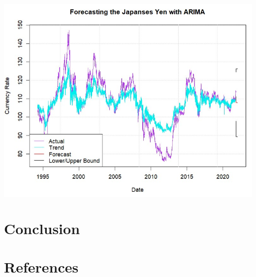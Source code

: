 \documentclass[11pt,preprint, authoryear]{elsarticle}
\let\origfigure\figure
\let\endorigfigure\endfigure
\renewenvironment{figure}[1][2] {
    \expandafter\origfigure\expandafter[H]
} {
    \endorigfigure
}
\numberwithin{equation}{section}
\numberwithin{figure}{section}
\numberwithin{table}{section}
\begin{document}
\begin{figure}
\centering
\includegraphics[scale=0.5]{fore3.jpg}
\caption{Forecasing Results (2)}
\label{for2}
\end{figure}

\hypertarget{conclusion}{%
\section{Conclusion}\label{conclusion}}

\newpage

\hypertarget{references}{%
\section*{References}\label{references}}
\end{document}
